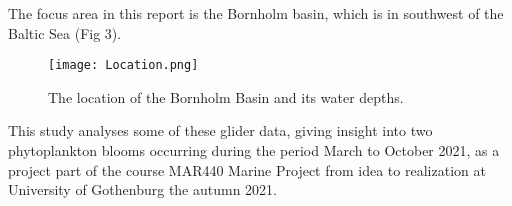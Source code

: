 \documentclass[../Main.tex]{subfiles}
\begin{document}
The focus area in this report is the Bornholm basin, which is in southwest of the Baltic Sea (Fig 3).

\begin{figure}[H]
\texttt{[image: Location.png]}
\caption{The location of the Bornholm Basin and its water depths.\supercite{fig3}}
\end{figure}

This study analyses some of these glider data, giving insight into two phytoplankton blooms occurring during the period March to October 2021, 
as a project part of the course MAR440 Marine Project from idea to realization at University of Gothenburg the autumn 2021.
\end{document}
